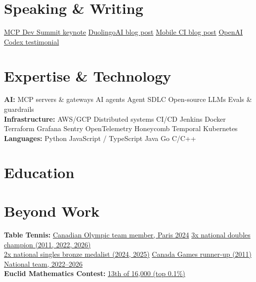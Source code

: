 \documentclass[]{plushcv}
\begin{document}
\section{Speaking \& Writing}
\href{https://youtu.be/5sb9iA2v78g}{MCP Dev Summit keynote} \textbullet{} \href{https://blog.duolingo.com/aislackbot/}{DuolingoAI blog post} \textbullet{} \href{https://blog.duolingo.com/sped-up-android-ios-builds/}{Mobile CI blog post} \textbullet{} \href{https://openai.com/codex/}{OpenAI Codex testimonial}
\sectionsep

\section{Expertise \& Technology}
\textbf{AI:} MCP servers \& gateways \textbullet{} AI agents \textbullet{} Agent SDLC \textbullet{} Open-source LLMs \textbullet{} Evals \& guardrails \\
\textbf{Infrastructure:} AWS/GCP \textbullet{} Distributed systems \textbullet{} CI/CD \textbullet{} Jenkins \textbullet{} Docker \textbullet{} Terraform \textbullet{} Grafana \textbullet{} Sentry \textbullet{} OpenTelemetry \textbullet{} Honeycomb \textbullet{} Temporal \textbullet{} Kubernetes \\
\textbf{Languages:} Python \textbullet{} JavaScript / TypeScript \textbullet{} Java \textbullet{} Go \textbullet{} C/C++
\sectionsep

\section{Education}
{\leftskip=32pt}
\sectionsep

\section{Beyond Work}
\textbf{Table Tennis:} \href{https://olympic.ca/press/experienced-team-canada-table-tennis-team-announced-for-paris-2024/}{Canadian Olympic team member, Paris 2024} \textbullet{} \href{https://www.instagram.com/p/Da9Qw_-jXyL/}{3x national doubles champion (2011, 2022, 2026)} \\
\href{https://ttcanada.ca/champions-crowned-at-the-2025-canadian-senior-table-tennis-championships}{2x national singles bronze medalist (2024, 2025)} \textbullet{} \href{https://canadagames2009.wordpress.com/2011/02/25/two-ontario-boys-to-meet-in-the-gold-medal-final-in-table-tennis}{Canada Games runner-up (2011)} \textbullet{} \href{https://ttcanada.ca/canadian-national-team-members-2021/}{National team, 2022--2026} \\
\textbf{Euclid Mathematics Contest:} \href{https://www.yumpu.com/en/document/view/4027500/2011-results-euclid-contest-2011-resultats-concours-euclide}{13th of 16,000 (top 0.1\%)}
\end{document}

